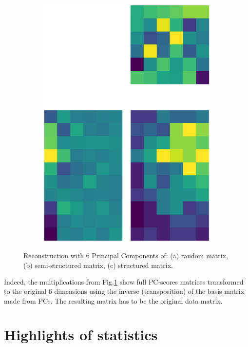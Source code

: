 \documentclass[10pt,twocolumn]{article}
\begin{document}
\begin{figure}[H]
\begin{subfigure}[t]{.15\textwidth}
\includegraphics[scale=.2]{DWGs/structured-matrix-reconstruction-PCs-6.eps}
\caption{ }
\end{subfigure}
\caption{Reconstruction with 6 Principal Components of: (a) random matrix, (b) semi-structured matrix, (c) structured matrix.}
\label{fig:matrices-reconstruction-6}
\end{figure}

Indeed, the multiplications from Fig.\ref{fig:matrices-reconstruction-6} show full PC-scores matrices transformed to the original 6 dimensions using the inverse (transposition) of the basis matrix made from PCs. The resulting matrix has to be the original data matrix.



\appendix



\section{Highlights of statistics} \label{app:B}
\end{document}
